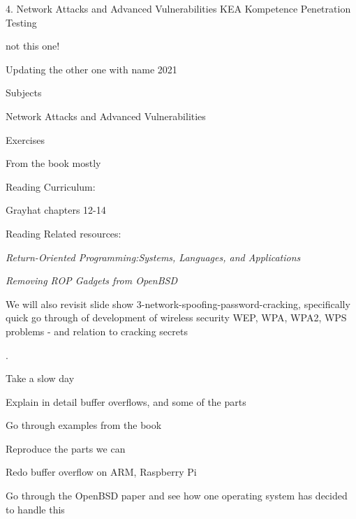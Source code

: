 \documentclass[Screen16to9,17pt]{foils}
\begin{document}
\mytitlepage
{4. Network Attacks and Advanced Vulnerabilities}
{KEA Kompetence Penetration Testing}

\stop not this one!

Updating the other one with name 2021



\begin{list1}
\item Subjects
\begin{list2}
\item Network Attacks and Advanced Vulnerabilities

\end{list2}
\item Exercises
\begin{list2}
\item From the book mostly
\end{list2}
\item  Reading Curriculum:
\begin{list2}
\item Grayhat chapters 12-14
\end{list2}
\item  Reading Related resources:
\begin{list2}
\item \emph{Return-Oriented Programming:Systems, Languages, and Applications}
\item \emph{Removing ROP Gadgets from OpenBSD}
\end{list2}
\item We will also revisit slide show 3-network-spoofing-password-cracking, specifically quick go through of development of wireless security WEP, WPA, WPA2, WPS problems - and relation to cracking secrets
\end{list1}



.

\begin{list1}
\item Take a slow day
\item Explain in detail buffer overflows, and some of the parts
\item Go through examples from the book
\item Reproduce the parts we can
\item Redo buffer overflow on ARM, Raspberry Pi
\item Go through the OpenBSD paper and see how one operating system has decided to handle this
\end{list1}
\end{document}
